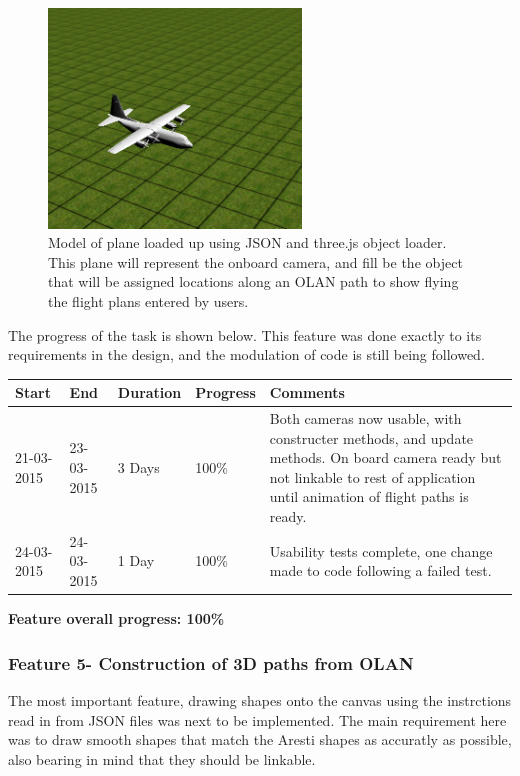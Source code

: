 \clearpage

\begin{figure}[h!]
  \centering
      \includegraphics[width=0.6\textwidth]{images/plane.png}
  \caption{Model of plane loaded up using JSON and three.js object loader. This plane will represent the onboard camera, and fill be the object that will be assigned locations along an OLAN path to show flying the flight plans entered by users.}
  \label{fig:plane}
\end{figure}

The progress of the task is shown below. This feature was done exactly to its requirements in the design, and the modulation of code is still being followed.

\begin{table}[h]
\begin{tabular}{|l|l|l|l|p{7cm}|}
\hline
\textbf{Start} & \textbf{End} & \textbf{Duration} & \textbf{Progress} & \textbf{Comments}                                                                                                     \\ \hline
21-03-2015     & 23-03-2015   & 3 Days            & 100\%             &  Both cameras now usable, with constructer methods, and update methods. On board camera ready but not linkable to rest of application until animation of flight paths is ready.\\ \hline
24-03-2015     & 24-03-2015   & 1 Day            & 100\%             &  Usability tests complete, one change made to code following a failed test. \\ \hline
\end{tabular}
\end{table}

\textbf{Feature overall progress: 100\%}

\subsubsection{Feature 5- Construction of 3D paths from OLAN}
The most important feature, drawing shapes onto the canvas using the instrctions read in from JSON files was next to be implemented. The main requirement here was to draw smooth shapes that match the Aresti shapes as accuratly as possible, also bearing in mind that they should be linkable.

